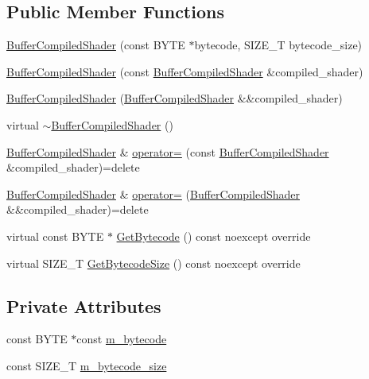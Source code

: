 \subsection*{Public Member Functions}
\begin{DoxyCompactItemize}
\item 
\hyperlink{structmage_1_1_buffer_compiled_shader_ab61380440bd369e49ecab09c75dac32a}{Buffer\+Compiled\+Shader} (const B\+Y\+TE $\ast$bytecode, S\+I\+Z\+E\+\_\+T bytecode\+\_\+size)
\item 
\hyperlink{structmage_1_1_buffer_compiled_shader_a1eecd5db202b7731925a8e301ced8c83}{Buffer\+Compiled\+Shader} (const \hyperlink{structmage_1_1_buffer_compiled_shader}{Buffer\+Compiled\+Shader} \&compiled\+\_\+shader)
\item 
\hyperlink{structmage_1_1_buffer_compiled_shader_a0dad36c9b2c73ad9053d90c8e673d0b1}{Buffer\+Compiled\+Shader} (\hyperlink{structmage_1_1_buffer_compiled_shader}{Buffer\+Compiled\+Shader} \&\&compiled\+\_\+shader)
\item 
virtual \hyperlink{structmage_1_1_buffer_compiled_shader_a39ca72436bfd68e14c41fead70540edc}{$\sim$\+Buffer\+Compiled\+Shader} ()
\item 
\hyperlink{structmage_1_1_buffer_compiled_shader}{Buffer\+Compiled\+Shader} \& \hyperlink{structmage_1_1_buffer_compiled_shader_ab264c24731dc03799e8620edd378b26a}{operator=} (const \hyperlink{structmage_1_1_buffer_compiled_shader}{Buffer\+Compiled\+Shader} \&compiled\+\_\+shader)=delete
\item 
\hyperlink{structmage_1_1_buffer_compiled_shader}{Buffer\+Compiled\+Shader} \& \hyperlink{structmage_1_1_buffer_compiled_shader_a4894525a724a0de0228da66494fe9a3e}{operator=} (\hyperlink{structmage_1_1_buffer_compiled_shader}{Buffer\+Compiled\+Shader} \&\&compiled\+\_\+shader)=delete
\item 
virtual const B\+Y\+TE $\ast$ \hyperlink{structmage_1_1_buffer_compiled_shader_ae6b2b4b5c9b96d7ca680724ccf0affb3}{Get\+Bytecode} () const noexcept override
\item 
virtual S\+I\+Z\+E\+\_\+T \hyperlink{structmage_1_1_buffer_compiled_shader_aa9ab3a1df896367280c259734ff29bc0}{Get\+Bytecode\+Size} () const noexcept override
\end{DoxyCompactItemize}
\subsection*{Private Attributes}
\begin{DoxyCompactItemize}
\item 
const B\+Y\+TE $\ast$const \hyperlink{structmage_1_1_buffer_compiled_shader_a51e10b328a0b6d2ffaf9c9b7d72fac2f}{m\+\_\+bytecode}
\item 
const S\+I\+Z\+E\+\_\+T \hyperlink{structmage_1_1_buffer_compiled_shader_acefda4296642b7de44f3b242dc76b05f}{m\+\_\+bytecode\+\_\+size}
\end{DoxyCompactItemize}
